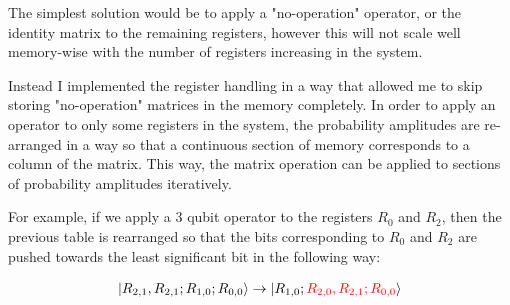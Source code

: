 The simplest solution would be to apply a "no-operation" operator, or the identity matrix to the remaining registers, however this will not scale well memory-wise with the number of registers increasing in the system.

Instead I implemented the register handling in a way that allowed me to skip storing "no-operation" matrices in the memory completely. In order to apply an operator to only some registers in the system, the probability amplitudes are re-arranged in a way so that a continuous section of memory corresponds to a column of the matrix. This way, the matrix operation can be applied to sections of probability amplitudes iteratively.

For example, if we apply a $3$ qubit operator to the registers $R_0$ and $R_2$, then the previous table is rearranged so that the bits corresponding to $R_0$ and $R_2$ are pushed towards the least significant bit in the following way:

\begin{align*}
\ket{R_{2,1},R_{2,1};R_{1,0};R_{0,0}} \rightarrow \ket{R_{1,0};\color{red}R_{2,0},R_{2,1};R_{0,0}\color{black}}
\end{align*}


